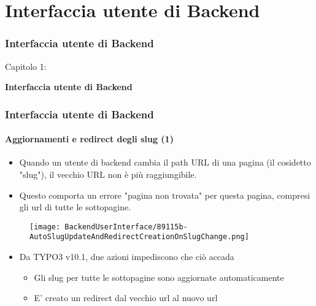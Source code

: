 %

\section{Interfaccia utente di Backend}
\begin{frame}[fragile]
	\frametitle{Interfaccia utente di Backend}

	\begin{center}\huge{Capitolo 1:}\end{center}
	\begin{center}\huge{\color{typo3darkgrey}\textbf{Interfaccia utente di Backend}}\end{center}

\end{frame}


\begin{frame}[fragile]
	\frametitle{Interfaccia utente di Backend}
	\framesubtitle{Aggiornamenti e redirect degli slug (1)}

	\begin{itemize}
		\item Quando un utente di backend cambia il path URL di una pagina (il cosidetto "slug"),
			il vecchio URL non è più raggiungibile.
		\item Questo comporta un errore "pagina non trovata" per questa pagina,
			compresi gli url di tutte le sottopagine.
	\end{itemize}

	\begin{figure}
		\texttt{[image: BackendUserInterface/89115b-AutoSlugUpdateAndRedirectCreationOnSlugChange.png]}
	\end{figure}

	\begin{itemize}
		\item Da TYPO3 v10.1, due azioni impediscono che ciò accada

			\begin{itemize}
				\item Gli slug per tutte le sottopagine sono aggiornate automaticamente
				\item E' creato un redirect dal vecchio url al nuovo url
			\end{itemize}

	\end{itemize}

\end{frame}

